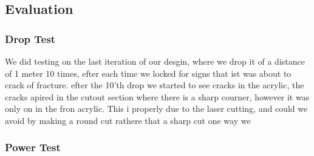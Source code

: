\subsection{Evaluation}
\subsubsection{Drop Test}
We did testing on the last iteration of our desgin, where we drop it of a distance of 1 meter 10 times, efter each time we locked for signs that ist was about to crack of fracture.
efter the 10'th drop we started to see cracks in the acrylic, the cracks apired in the cutout section where there is a sharp courner, however it was only on in the fron acrylic. 
This i properly due to the laser cutting, and could we avoid by making a round cut rathere that a sharp cut
one way we 

\subsubsection{Power Test}



